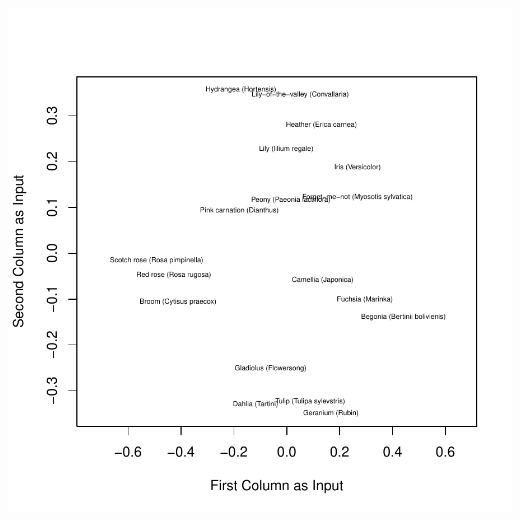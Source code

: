 \documentclass[12pt]{article}
\begin{document}
\includegraphics{jhuang63HW3-017}


\nocite{*}

\end{document}
